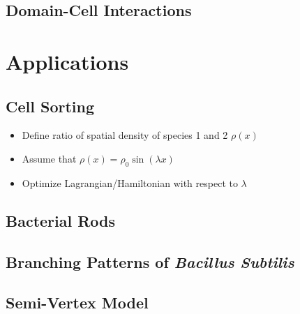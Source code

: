 \documentclass{article}
\begin{document}
\subsection{Domain-Cell Interactions}
\label{subsec:abstractions-domain-cell}

\section{Applications}
\label{section:applications}

\subsection{Cell Sorting}
\label{subsection:cell-sorting}

\begin{itemize}
    \item Define ratio of spatial density of species 1 and 2 $\rho(x)$
    \item Assume that $\rho(x) = \rho_0\sin(\lambda x)$
    \item Optimize Lagrangian/Hamiltonian with respect to $\lambda$
\end{itemize}

\subsection{Bacterial Rods}
\label{subsection:bacterial-rods}

\subsection{Branching Patterns of \textit{Bacillus Subtilis}}
\label{subsection:branching-patterns-of-bacillus-subtilis}

\subsection{Semi-Vertex Model}
\label{subsection:semi-vertex-model}
\end{document}

